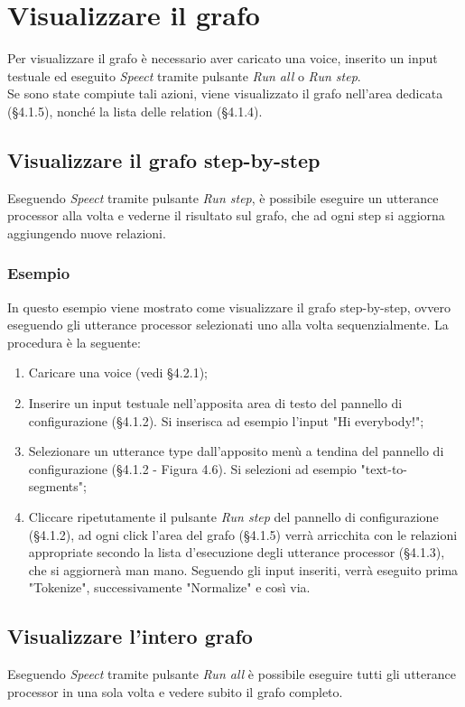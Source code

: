 \documentclass[openany,12pt,a4paper]{report}
\begin{document}
	\section{Visualizzare il grafo}
	Per visualizzare il grafo è necessario aver caricato una voice, inserito un input testuale ed eseguito \textit{Speect} tramite pulsante \textit{Run all} o \textit{Run step}.\\
	Se sono state compiute tali azioni, viene visualizzato il grafo nell'area dedicata (§4.1.5), nonché la lista delle relation (§4.1.4).
	
	\subsection{Visualizzare il grafo step-by-step}
	Eseguendo \textit{Speect} tramite pulsante \textit{Run step}, è possibile eseguire un utterance processor alla volta e vederne il risultato sul grafo, che ad ogni step si aggiorna aggiungendo nuove relazioni.
	
	\subsubsection*{Esempio}
	
	In questo esempio viene mostrato come visualizzare il grafo step-by-step, ovvero eseguendo gli utterance processor selezionati uno alla volta sequenzialmente. La procedura è la seguente:
	\begin{enumerate}
		\item Caricare una voice (vedi §4.2.1);
		\item Inserire un input testuale nell'apposita area di testo del pannello di configurazione (§4.1.2). Si inserisca ad esempio l'input "Hi everybody!";
		\item Selezionare un utterance type dall'apposito menù a tendina del pannello di configurazione (§4.1.2 - Figura 4.6). Si selezioni ad esempio "text-to-segments";
		\item Cliccare ripetutamente il pulsante \textit{Run step} del pannello di configurazione (§4.1.2), ad ogni click l'area del grafo (§4.1.5) verrà arricchita con le relazioni appropriate secondo la lista d'esecuzione degli utterance processor (§4.1.3), che si aggiornerà man mano. Seguendo gli input inseriti, verrà eseguito prima "Tokenize", successivamente "Normalize" e così via.
	\end{enumerate}
	
	\subsection{Visualizzare l'intero grafo}
	Eseguendo \textit{Speect} tramite pulsante \textit{Run all} è possibile eseguire tutti gli utterance processor in una sola volta e vedere subito il grafo completo.
	
\end{document}
